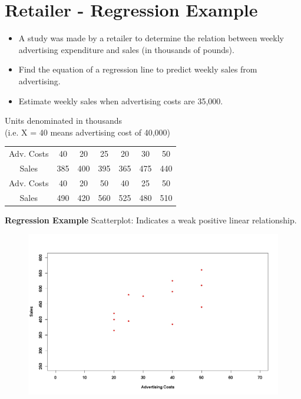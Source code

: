 \documentclass[]{report}
\begin{document}
\section{Retailer - Regression Example}
\begin{itemize}
	\item A study was made by a retailer to determine the relation between weekly advertising
	expenditure and sales (in thousands of pounds).
	\item Find the equation of a regression line
	to predict weekly sales from advertising.
	\item Estimate weekly sales when advertising
	costs are 35,000.
\end{itemize}


Units denominated in thousands \\(i.e. X = 40 means advertising cost of 40,000)
\begin{center}
	\begin{tabular}{|c|c|c|c|c|c|c|}
		\hline
		Adv. Costs & 40 & 20 & 25 & 20 & 30 & 50\\
		Sales & 385& 400& 395& 365& 475& 440\\ \hline \hline
		Adv. Costs & 40 & 20 & 50 & 40 & 25 & 50\\
		Sales & 490& 420& 560& 525& 480& 510\\
		\hline
	\end{tabular}
\end{center}



\textbf{Regression Example}
Scatterplot: Indicates a weak positive linear relationship.
\begin{center}
	\begin{figure}
		\includegraphics[scale=0.3]{images/12Bplot1.jpeg}\\
	\end{figure}
\end{center}
\end{document}
